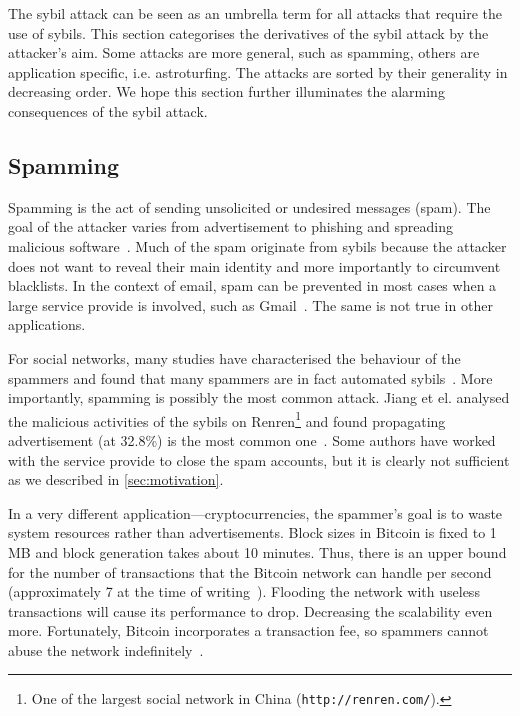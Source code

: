 The sybil attack can be seen as an umbrella term for all attacks that require
the use of sybils. This section categorises the derivatives of the sybil attack
by the attacker's aim. Some attacks are more general, such as spamming, others
are application specific, i.e. astroturfing. The attacks are sorted by their
generality in decreasing order. We hope this section further illuminates the
alarming consequences of the sybil attack.

\subsection{Spamming}
Spamming is the act of sending unsolicited or undesired messages (spam). The
goal of the attacker varies from advertisement to phishing and spreading
malicious software~\cite{twittermalware1, twittermalware2}. Much of the spam
originate from sybils because the attacker does not want to reveal their main
identity and more importantly to circumvent blacklists. In the context of email,
spam can be prevented in most cases when a large service provide is involved,
such as Gmail~\cite{adwords}. The same is not true in other applications.

For social networks, many studies have characterised the behaviour of the
spammers and found that many spammers are in fact automated
sybils~\cite{stringhini2010detecting, yang2012analyzing, grier2010spam,
  jiang2015understanding}. More importantly, spamming is possibly the most
common attack. Jiang et el. analysed the malicious activities of the sybils on
Renren\footnote{One of the largest social network in China
  (\texttt{http://renren.com/}).} and found propagating advertisement (at
32.8\%) is the most common one~\cite{jiang2015understanding}. Some authors have
worked with the service provide to close the spam accounts, but it is clearly
not sufficient as we described in \autoref{sec:motivation}.

In a very different application---cryptocurrencies, the spammer's goal is to
waste system resources rather than advertisements. Block sizes in Bitcoin is
fixed to 1 MB and block generation takes about 10 minutes. Thus, there is an
upper bound for the number of transactions that the Bitcoin network can handle
per second (approximately 7 at the time of writing~\cite{bitcointps}). Flooding
the network with useless transactions will cause its performance to drop.
Decreasing the scalability even more. Fortunately, Bitcoin incorporates a
transaction fee, so spammers cannot abuse the network
indefinitely~\cite{bitcoinspam}.


